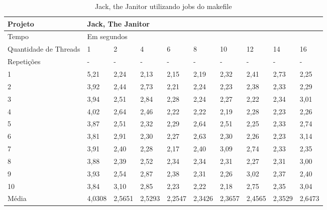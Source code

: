 \begin{table}[h]
\centering
\begin{tabular}{|p{1cm}|p{1.4cm}|p{1.4cm}|p{1.4cm}|p{1.4cm}|p{1.4cm}|p{1.4cm}|p{1.4cm}|p{1.4cm}|p{1.4cm}|}
\hline
Projeto               & \multicolumn{9}{l|}{Jack, The Janitor} \\ \hline
Tempo                 & \multicolumn{9}{l|}{Em segundos}      \\ \hline
Quantidade de Threads & 1 & 2 & 4 & 6 & 8 & 10 & 12 & 14 & 16 \\ \hline
Repetições            & - & - & - & - & - & -  & -  & -  & -  \\ \hline
1 & 5,21    & 2,24  &  2,13   & 2,15   & 2,19   & 2,32   & 2,41  &  2,73  & 2,25 \\ \hline
2 & 3,92    & 2,44  &  2,73   & 2,21   & 2,24   & 2,23   & 2,38  &  2,33  & 2,29 \\ \hline
3 & 3,94    & 2,51  &  2,84   & 2,28   & 2,24   & 2,27   & 2,22  &  2,34  & 3,01 \\ \hline
4 & 4,02    & 2,64  &  2,46   & 2,22   & 2,22   & 2,19   & 2,28  &  2,23  & 2,26 \\ \hline
5 & 3,87    & 2,51  &  2,32   & 2,29   & 2,64   & 2,51   & 2,25  &  2,33  & 2,74 \\ \hline
6 & 3,81    & 2,91  &  2,30   & 2,27   & 2,63   & 2,30   & 2,26  &  2,23  & 3,14 \\ \hline
7 & 3,91    & 2,40  &  2,28   & 2,17   & 2,40   & 3,09   & 2,74  &  2,33  & 2,35 \\ \hline
8 & 3,88    & 2,39  &  2,52   & 2,34   & 2,34   & 2,31   & 2,27  &  2,31  & 3,00 \\ \hline
9 & 3,93    & 2,54  &  2,87   & 2,38   & 2,31   & 2,26   & 3,02  &  2,37  & 2,40 \\ \hline
10 & 3,84    & 3,10  &  2,85   & 2,23   & 2,22   & 2,18   & 2,75  &  2,35  & 3,04 \\ \hline
Média & 4,0308  & 2,5651&  2,5293 & 2,2547 & 2,3426 & 2,3657 & 2,4565&  2,3529 & 2,6473 \\ \hline
\end{tabular}
\caption{Jack, the Janitor utilizando jobs do makefile}
\label{tab:janitor}
\end{table}


